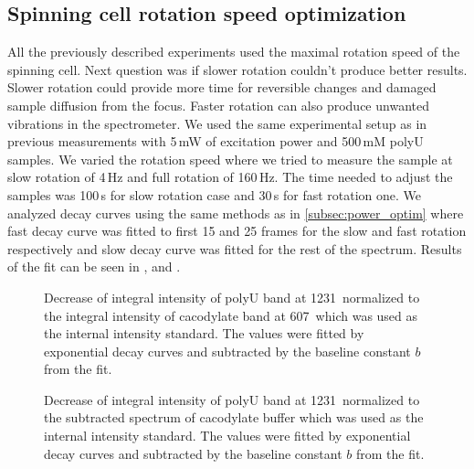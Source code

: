 \subsection{Spinning cell rotation speed optimization}

All the previously described experiments used the maximal rotation speed of
the spinning cell.
Next question was if slower rotation couldn't produce better results.
Slower rotation could provide more time for reversible changes and damaged
sample diffusion from the focus.
Faster rotation can also produce unwanted vibrations in the spectrometer.
We used the same experimental setup as in previous measurements with 5\,mW of
excitation power and 500\,mM polyU samples.
We varied the rotation speed where we tried to measure the sample at slow
rotation of 4\,Hz and full rotation of 160\,Hz.
The time needed to adjust the samples was 100\,s for slow rotation case and
30\,s for fast rotation one.
We analyzed decay curves using the same methods as in
\cref{subsec:power_optim}
where fast decay curve was fitted to first 15 and 25 frames for the slow and
fast rotation respectively and slow decay curve was fitted for the rest of
the spectrum.
Results of the fit can be seen in
,
and
.

\begin{figure}
	\centering
	
	\caption{Decrease of integral intensity of polyU band at 1231\,\icm{}
		normalized to the integral intensity of cacodylate band at 607\,\icm{}
		which was used as the internal intensity standard. The values were fitted
		by exponential decay curves  and subtracted
		by the baseline constant $b$ from the fit.}
	\label{\figlabel{rotation_optim:fast_decay}}
\end{figure}

\begin{figure}
	\centering
	
	\caption{Decrease of integral intensity of polyU band at 1231\,\icm{}
		normalized to the subtracted spectrum of cacodylate buffer which was used
		as the internal intensity standard. The values were fitted by exponential
		decay curves  and subtracted by the baseline
		constant $b$ from the fit.}
	\label{\figlabel{rotation_optim:slow_decay}}
\end{figure}

